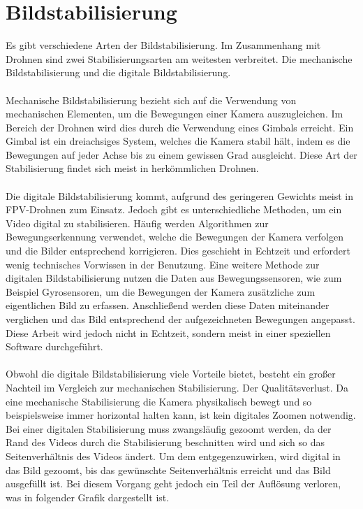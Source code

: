\section[Bildstabilisierung]{Bildstabilisierung}
    Es gibt verschiedene Arten der Bildstabilisierung. Im Zusammenhang mit Drohnen sind zwei Stabilisierungsarten am weitesten verbreitet. Die mechanische Bildstabilisierung und die digitale Bildstabilisierung.
    \\ \\
    Mechanische Bildstabilisierung bezieht sich auf die Verwendung von mechanischen Elementen, um die Bewegungen einer Kamera auszugleichen. Im Bereich der Drohnen wird dies durch die Verwendung eines Gimbals erreicht. Ein Gimbal ist ein dreiachsiges System, welches die Kamera stabil hält, indem es die Bewegungen auf jeder Achse bis zu einem gewissen Grad ausgleicht. Diese Art der Stabilisierung findet sich meist in herkömmlichen Drohnen.
    \\ \\
    Die digitale Bildstabilisierung kommt, aufgrund des geringeren Gewichts meist in FPV-Drohnen zum Einsatz. Jedoch gibt es unterschiedliche Methoden, um ein Video digital zu stabilisieren. Häufig werden Algorithmen zur Bewegungserkennung verwendet, welche die Bewegungen der Kamera verfolgen und die Bilder entsprechend korrigieren. Dies geschieht in Echtzeit und erfordert wenig technisches Vorwissen in der Benutzung. Eine weitere Methode zur digitalen Bildstabilisierung nutzen die Daten aus Bewegungssensoren, wie zum Beispiel Gyrosensoren, um die Bewegungen der Kamera zusätzliche zum eigentlichen Bild zu erfassen. Anschließend werden diese Daten miteinander verglichen und das Bild entsprechend der aufgezeichneten Bewegungen angepasst. Diese Arbeit wird jedoch nicht in Echtzeit, sondern meist in einer speziellen Software durchgeführt.
    \\ \\
    Obwohl die digitale Bildstabilisierung viele Vorteile bietet, besteht ein großer Nachteil im Vergleich zur mechanischen Stabilisierung. Der Qualitätsverlust. Da eine mechanische Stabilisierung die Kamera physikalisch bewegt und so beispielsweise immer horizontal halten kann, ist kein digitales Zoomen notwendig. Bei einer digitalen Stabilisierung muss zwangsläufig gezoomt werden, da der Rand des Videos durch die Stabilisierung beschnitten wird und sich so das Seitenverhältnis des Videos ändert. Um dem entgegenzuwirken, wird digital in das Bild gezoomt, bis das gewünschte Seitenverhältnis erreicht und das Bild ausgefüllt ist. Bei diesem Vorgang geht jedoch ein Teil der Auflösung verloren, was in folgender Grafik dargestellt ist.
